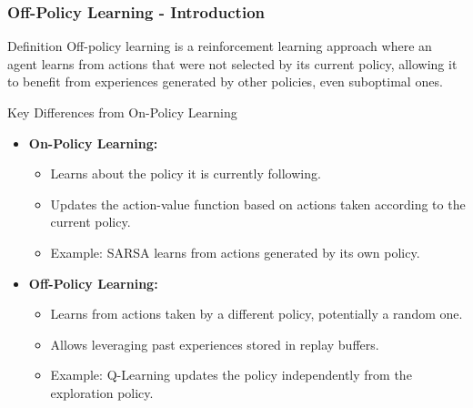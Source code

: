 \documentclass[aspectratio=169]{beamer}
\begin{document}
\begin{frame}[fragile]
    \frametitle{Off-Policy Learning - Introduction}
    \begin{block}{Definition}
        Off-policy learning is a reinforcement learning approach where an agent learns from actions that were not selected by its current policy, allowing it to benefit from experiences generated by other policies, even suboptimal ones.
    \end{block}
    
    \begin{block}{Key Differences from On-Policy Learning}
        \begin{itemize}
            \item \textbf{On-Policy Learning:}
            \begin{itemize}
                \item Learns about the policy it is currently following.
                \item Updates the action-value function based on actions taken according to the current policy.
                \item Example: SARSA learns from actions generated by its own policy.
            \end{itemize}

            \item \textbf{Off-Policy Learning:}
            \begin{itemize}
                \item Learns from actions taken by a different policy, potentially a random one.
                \item Allows leveraging past experiences stored in replay buffers.
                \item Example: Q-Learning updates the policy independently from the exploration policy.
            \end{itemize}
        \end{itemize}
    \end{block}
\end{frame}
\end{document}
